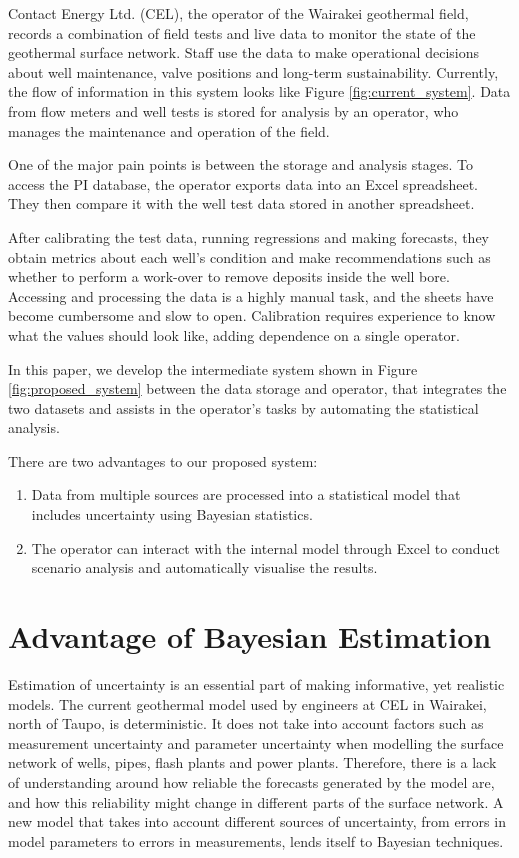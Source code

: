 \documentclass[a4paper, 12pt]{article}
\begin{document}
Contact Energy Ltd. (CEL), the operator of the Wairakei geothermal field, records a combination of field tests and live data to monitor the state of the geothermal surface network. Staff use the data to make operational decisions about well maintenance, valve positions and long-term sustainability. Currently, the flow of information in this system looks like Figure \ref{fig:current_system}. Data from flow meters and well tests is stored for analysis by an operator, who manages the maintenance and operation of the field. 

One of the major pain points is between the storage and analysis stages. To access the PI database, the operator exports data into an Excel spreadsheet. They then compare it with the well test data stored in another spreadsheet.

After calibrating the test data, running regressions and making forecasts, they obtain metrics about each well's condition and make recommendations such as whether to perform a work-over to remove deposits inside the well bore. Accessing and processing the data is a highly manual task, and the sheets have become cumbersome and slow to open. Calibration requires experience to know what the values should look like, adding dependence on a single operator.

In this paper, we develop the intermediate system shown in Figure \ref{fig:proposed_system} between the data storage and operator, that integrates the two datasets and assists in the operator's tasks by automating the statistical analysis.

There are two advantages to our proposed system:
\begin{enumerate}
\item Data from multiple sources are processed into a statistical model that includes uncertainty using Bayesian statistics.
\item The operator can interact with the internal model through Excel to conduct scenario analysis and automatically visualise the results.
\end{enumerate}

\section{Advantage of Bayesian Estimation}
Estimation of uncertainty is an essential part of making informative, yet realistic models. The current geothermal model used by engineers at CEL in Wairakei, north of Taupo, is deterministic. It does not take into account factors such as measurement uncertainty and parameter uncertainty when modelling the surface network of wells, pipes, flash plants and power plants. Therefore, there is a lack of understanding around how reliable the forecasts generated by the model are, and how this reliability might change in different parts of the surface network.
A new model that takes into account different sources of uncertainty, from errors in model parameters to errors in measurements, lends itself to Bayesian techniques. 
\end{document}
